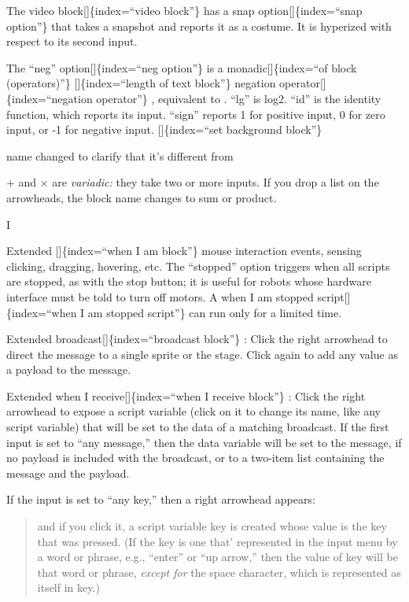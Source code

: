 \documentclass[
  letterpaper,
]{book}
\begin{document}
The video block{[}{]}\{index=``video block''\} has a snap
option{[}{]}\{index=``snap option''\} that takes a snapshot and reports
it as a costume. It is hyperized with respect to its second input.

The ``neg'' option{[}{]}\{index=``neg option''\} is a
monadic{[}{]}\{index=``of block (operators)''\} {[}{]}\{index=``length
of text block''\} negation operator{[}{]}\{index=``negation operator''\}
, equivalent to . ``lg'' is log2. ``id'' is the identity function, which
reports its input. ``sign'' reports 1 for positive input, 0 for zero
input, or -1 for negative input. {[}{]}\{index=``set background
block''\}

name changed to clarify that it's different from

+ and × are \emph{variadic:} they take two or more inputs. If you drop a
list on the arrowheads, the block name changes to sum or product.

I

Extended {[}{]}\{index=``when I am block''\} mouse interaction events,
sensing clicking, dragging, hovering, etc. The ``stopped'' option
triggers when all scripts are stopped, as with the stop button; it is
useful for robots whose hardware interface must be told to turn off
motors. A when I am stopped script{[}{]}\{index=``when I am stopped
script''\} can run only for a limited time.

\label{broadcast}{}Extended
broadcast{[}{]}\{index=``broadcast block''\} : Click the right arrowhead
to direct the message to a single sprite or the stage. Click again to
add any value as a payload to the message.

Extended when I receive{[}{]}\{index=``when I receive block''\} : Click
the right arrowhead to expose a script variable (click on it to change
its name, like any script variable) that will be set to the data of a
matching broadcast. If the first input is set to ``any message,'' then
the data variable will be set to the message, if no payload is included
with the broadcast, or to a two-item list containing the message and the
payload.

If the input is set to ``any key,'' then a right arrowhead appears:

\begin{quote}
and if you click it, a script variable key is created whose value is the
key that was pressed. (If the key is one that' represented in the input
menu by a word or phrase, e.g., ``enter'' or ``up arrow,'' then the
value of key will be that word or phrase, \emph{except for} the space
character, which is represented as itself in key.)\\
\label{ask_lists}{}
\end{quote}
\end{document}
